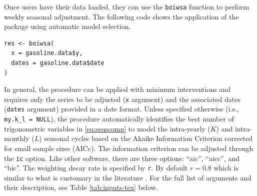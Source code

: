 Once users have their data loaded, they can use the \texttt{boiwsa} function to perform weekly seasonal adjustment. The following code shows the application of the package using automatic model selection.

\begin{verbatim}
res <- boiwsa(
  x = gasoline.data$y,
  dates = gasoline.data$date
)
\end{verbatim}

In general, the procedure can be applied with minimum interventions and requires only the series to be adjusted (\texttt{x} argument) and the associated dates (\texttt{dates} argument) provided in a date format. Unless specified otherwise (i.e., \texttt{my.k\_l\ =\ NULL}), the procedure automatically identifies the best number of trigonometric variables in \eqref{eq:seqscomp} to model the intra-yearly (\(K\)) and intra-monthly (\(L\)) seasonal cycles based on the Akaike Information Criterion corrected for small sample sizes (AICc). The information criterion can be adjusted through the \texttt{ic} option. Like other software, there are three options: ``aic'', ``aicc'', and ``bic''. The weighting decay rate is specified by \texttt{r}. By default \(r=0.8\) which is similar to what is customary in the literature \citep{harvey1990}. For the full list of arguments and their description, see Table \ref{tab:inputs-tex} below.

\begin{table}[H]
\centering
\caption{\label{tab:inputs-tex}Input arguments for boiwsa}
\centering
{}
\end{table}

